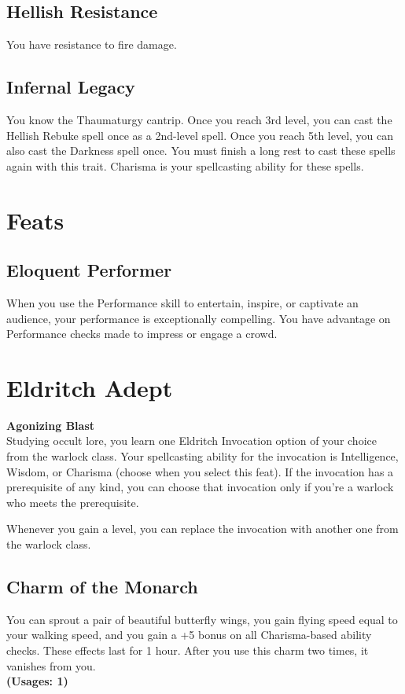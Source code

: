 \documentclass[letterpaper,openany,oneside,twocolumn]{book}
\begin{document}
\subsection*{Hellish Resistance}
You have resistance to fire damage.
\subsection*{Infernal Legacy}
You know the Thaumaturgy cantrip. Once you reach 3rd level, you can cast the Hellish Rebuke spell once as a 2nd-level spell. Once you reach 5th level, you can also cast the Darkness spell once. You must finish a long rest to cast these spells again with this trait. Charisma is your spellcasting ability for these spells.

\section*{Feats}
\subsection*{Eloquent Performer}
When you use the Performance skill to entertain, inspire, or captivate an audience, your performance is exceptionally compelling. You have advantage on Performance checks made to impress or engage a crowd.
\section*{Eldritch Adept}
\textbf{Agonizing Blast}\\
Studying occult lore, you learn one Eldritch Invocation option of your choice from the warlock class. Your spellcasting ability for the invocation is Intelligence, Wisdom, or Charisma (choose when you select this feat). If the invocation has a prerequisite of any kind, you can choose that invocation only if you’re a warlock who meets the prerequisite.

Whenever you gain a level, you can replace the invocation with another one from the warlock class.
\subsection*{Charm of the Monarch}
You can sprout a pair of beautiful butterfly wings, you gain flying speed equal to your walking speed, and you gain a +5 bonus on all Charisma-based ability checks. These effects last for 1 hour. After you use this charm two times, it vanishes from you.\\
\textbf{(Usages: 1)}
\end{document}
